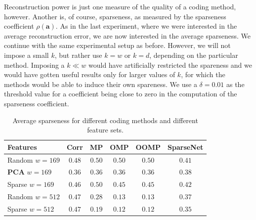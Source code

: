 \documentclass[12pt,a4paper,oneside,english]{UPBThesis}
\begin{document}
Reconstruction power is just one measure of the quality of a coding method, however. Another is, of course, sparseness, as measured by the sparseness coefficient $\rho(\textbf{a})$. As in the last experiment, where we were interested in the average reconstruction error, we are now interested in the average sparseness. We continue with the same experimental setup as before. However, we will not impose a small $k$, but rather use $k=w$ or $k=d$, depending on the particular method. Imposing a $k \ll w$ would have artificially restricted the spareness and we would have gotten useful results only for larger values of $k$, for which the methods would be able to induce their own spareness. We use a $\delta = 0.01$ as the threshold value for a coefficient being close to zero in the computation of the sparseness coefficient.

\renewcommand{\arraystretch}{1.2}
\begin{table}
  \caption{Average sparseness for different coding methods and different feature sets.}
  \label{table:RecSparseSparseness}
  \begin{tabularx}{\textwidth}{|R|ccccc|}
    \hline
    Features & \textbf{Corr} & \textbf{MP} & \textbf{OMP} & \textbf{OOMP} & SparseNet \tabularnewline \hline\hline
    Random $w=169$ & $0.48$ & $0.50$ & $0.50$ & $0.50$ & $0.41$ \tabularnewline
    \textbf{PCA} $w=169$ & $0.36$ & $0.36$ & $0.36$ & $0.36$ & $0.38$ \tabularnewline
    Sparse $w=169$ & $0.46$ & $0.50$ & $0.45$ & $0.45$ & $0.42$ \tabularnewline
    Random $w=512$ & $0.47$ & $0.28$ & $0.13$ & $0.13$ & $0.37$ \tabularnewline
    Sparse $w=512$ & $0.47$ & $0.19$ & $0.12$ & $0.12$ & $0.35$ \tabularnewline
    \hline
  \end{tabularx}
\end{table}
\renewcommand{\arraystretch}{1.0}
\end{document}
